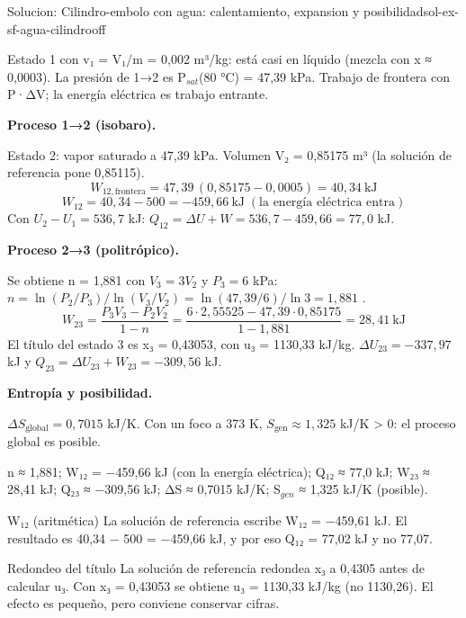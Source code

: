 \documentclass[11pt,a4paper]{article}
\begin{document}
\begin{ocg}{Solucion: Cilindro-embolo con agua: calentamiento, expansion y posibilidad}{sol-ex-sf-agua-cilindro}{off}
\begin{antesbox}
Estado 1 con v₁ = V₁/m = 0,002 m³/kg: está casi en líquido (mezcla con x ≈ 0,0003). La presión de 1→2 es P$_{sat}$(80 °C) = 47,39 kPa. Trabajo de frontera con P·ΔV; la energía eléctrica es trabajo entrante.
\end{antesbox}

\par\medskip\noindent\textbf{Proceso 1→2 (isobaro).}\par
Estado 2: vapor saturado a 47,39 kPa. Volumen V₂ = 0,85175 m³ (la solución de referencia pone 0,85115).  \[W_{12,\text{frontera}} = 47{,}39\,(0{,}85175 - 0{,}0005) = 40{,}34\ \text{kJ}\]   \[W_{12} = 40{,}34 - 500 = -459{,}66\ \text{kJ} \;(\text{la energía eléctrica entra})\]  Con  $U_2 - U_1 = 536{,}7$  kJ:  $Q_{12} = \Delta U + W = 536{,}7 - 459{,}66 = 77{,}0$  kJ.

\par\medskip\noindent\textbf{Proceso 2→3 (politrópico).}\par
Se obtiene n = 1,881 con  $V_3 = 3V_2$  y  $P_3 = 6$  kPa:  $n = \ln(P_2/P_3)/\ln(V_3/V_2) = \ln(47{,}39/6)/\ln 3 = 1{,}881$ .  \[W_{23} = \frac{P_3V_3 - P_2V_2}{1 - n} = \frac{6\cdot 2{,}55525 - 47{,}39\cdot 0{,}85175}{1 - 1{,}881} = 28{,}41\ \text{kJ}\]  El título del estado 3 es x₃ = 0,43053, con u₃ = 1130,33 kJ/kg.  $\Delta U_{23} = -337{,}97$  kJ y  $Q_{23} = \Delta U_{23} + W_{23} = -309{,}56$  kJ.

\par\medskip\noindent\textbf{Entropía y posibilidad.}\par
$\Delta S_{\text{global}} = 0{,}7015$  kJ/K. Con un foco a 373 K,  $S_{\text{gen}} \approx 1{,}325$  kJ/K > 0: el proceso global es posible.

\begin{resbox}
n ≈ 1,881; W₁₂ = −459,66 kJ (con la energía eléctrica); Q₁₂ ≈ 77,0 kJ; W₂₃ ≈ 28,41 kJ; Q₂₃ ≈ −309,56 kJ; ΔS ≈ 0,7015 kJ/K; S$_{gen}$ ≈ 1,325 kJ/K (posible).
\end{resbox}

\begin{ojobox}{W₁₂ (aritmética)}
La solución de referencia escribe W₁₂ = −459,61 kJ. El resultado es 40,34 − 500 = −459,66 kJ, y por eso Q₁₂ = 77,02 kJ y no 77,07.
\end{ojobox}

\begin{ojobox}{Redondeo del título}
La solución de referencia redondea x₃ a 0,4305 antes de calcular u₃. Con x₃ = 0,43053 se obtiene u₃ = 1130,33 kJ/kg (no 1130,26). El efecto es pequeño, pero conviene conservar cifras.
\end{ojobox}

\hspace{0pt}\end{ocg}
\end{document}
